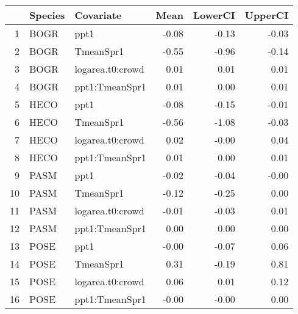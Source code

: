 \begin{table}[ht]
\centering
\begin{tabular}{rllrrr}
  \hline
 & Species & Covariate & Mean & LowerCI & UpperCI \\ 
  \hline
1 & BOGR & ppt1 & -0.08 & -0.13 & -0.03 \\ 
  2 & BOGR & TmeanSpr1 & -0.55 & -0.96 & -0.14 \\ 
  3 & BOGR & logarea.t0:crowd & 0.01 & 0.01 & 0.01 \\ 
  4 & BOGR & ppt1:TmeanSpr1 & 0.01 & 0.00 & 0.01 \\ 
  5 & HECO & ppt1 & -0.08 & -0.15 & -0.01 \\ 
  6 & HECO & TmeanSpr1 & -0.56 & -1.08 & -0.03 \\ 
  7 & HECO & logarea.t0:crowd & 0.02 & -0.00 & 0.04 \\ 
  8 & HECO & ppt1:TmeanSpr1 & 0.01 & 0.00 & 0.01 \\ 
  9 & PASM & ppt1 & -0.02 & -0.04 & -0.00 \\ 
  10 & PASM & TmeanSpr1 & -0.12 & -0.25 & 0.00 \\ 
  11 & PASM & logarea.t0:crowd & -0.01 & -0.03 & 0.01 \\ 
  12 & PASM & ppt1:TmeanSpr1 & 0.00 & 0.00 & 0.00 \\ 
  13 & POSE & ppt1 & -0.00 & -0.07 & 0.06 \\ 
  14 & POSE & TmeanSpr1 & 0.31 & -0.19 & 0.81 \\ 
  15 & POSE & logarea.t0:crowd & 0.06 & 0.01 & 0.12 \\ 
  16 & POSE & ppt1:TmeanSpr1 & -0.00 & -0.00 & 0.00 \\ 
   \hline
\end{tabular}
\end{table}
